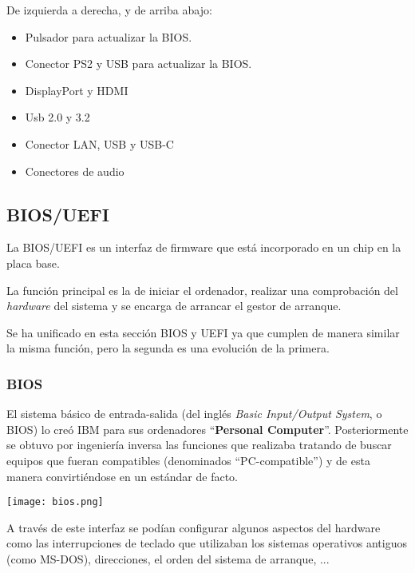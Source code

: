 De izquierda a derecha, y de arriba abajo:
\begin{itemize}
    \item Pulsador para actualizar la BIOS.
    \item Conector PS2 y USB para actualizar la BIOS.
    \item DisplayPort y HDMI
    \item Usb 2.0 y 3.2
    \item Conector LAN, USB y USB-C
    \item Conectores de audio
\end{itemize}


\subsection{BIOS/UEFI}
La BIOS/UEFI es un interfaz de firmware que está incorporado en un chip en la placa base.

La función principal es la de iniciar el ordenador, realizar una comprobación del \textit{hardware} del sistema  y se encarga de arrancar el gestor de arranque.

Se ha unificado en esta sección BIOS y UEFI ya que cumplen de manera similar la misma función, pero la segunda es una evolución de la primera.

\subsubsection{BIOS}

El sistema básico de entrada-salida (del inglés \textit{Basic Input/Output System}, o BIOS) lo creó IBM para sus ordenadores “\textbf{Personal Computer}”. Posteriormente se obtuvo por ingeniería inversa las funciones que realizaba tratando de buscar equipos  que fueran compatibles (denominados “PC-compatible”) y de esta manera convirtiéndose en un estándar de facto.

\begin{center}
    \texttt{[image: bios.png]}
\end{center}

A través de este interfaz se podían configurar algunos aspectos del hardware como las interrupciones de teclado que utilizaban los sistemas operativos antiguos (como MS-DOS), direcciones, el orden del sistema de arranque, ...


